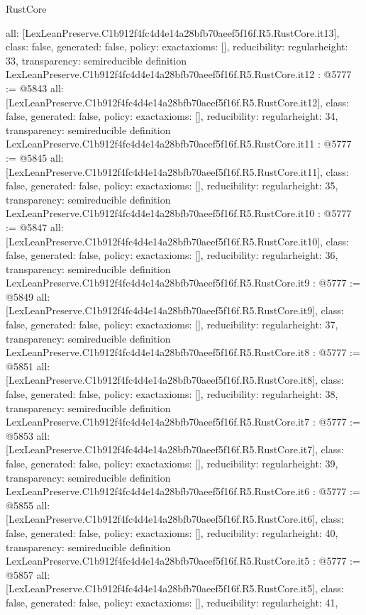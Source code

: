 \begin{lexlean}{RustCore}
\begin{coremodule}
{  all: [LexLeanPreserve.C1b912f4fc4d4e14a28bfb70aeef5f16f.R5.RustCore.it13],
  class: false,
  generated: false,
  policy: exact{axioms: []},
  reducibility: regular{height: 33},
  transparency: semireducible
}
definition LexLeanPreserve.C1b912f4fc4d4e14a28bfb70aeef5f16f.R5.RustCore.it12 : @5777 := @5843 {
  all: [LexLeanPreserve.C1b912f4fc4d4e14a28bfb70aeef5f16f.R5.RustCore.it12],
  class: false,
  generated: false,
  policy: exact{axioms: []},
  reducibility: regular{height: 34},
  transparency: semireducible
}
definition LexLeanPreserve.C1b912f4fc4d4e14a28bfb70aeef5f16f.R5.RustCore.it11 : @5777 := @5845 {
  all: [LexLeanPreserve.C1b912f4fc4d4e14a28bfb70aeef5f16f.R5.RustCore.it11],
  class: false,
  generated: false,
  policy: exact{axioms: []},
  reducibility: regular{height: 35},
  transparency: semireducible
}
definition LexLeanPreserve.C1b912f4fc4d4e14a28bfb70aeef5f16f.R5.RustCore.it10 : @5777 := @5847 {
  all: [LexLeanPreserve.C1b912f4fc4d4e14a28bfb70aeef5f16f.R5.RustCore.it10],
  class: false,
  generated: false,
  policy: exact{axioms: []},
  reducibility: regular{height: 36},
  transparency: semireducible
}
definition LexLeanPreserve.C1b912f4fc4d4e14a28bfb70aeef5f16f.R5.RustCore.it9 : @5777 := @5849 {
  all: [LexLeanPreserve.C1b912f4fc4d4e14a28bfb70aeef5f16f.R5.RustCore.it9],
  class: false,
  generated: false,
  policy: exact{axioms: []},
  reducibility: regular{height: 37},
  transparency: semireducible
}
definition LexLeanPreserve.C1b912f4fc4d4e14a28bfb70aeef5f16f.R5.RustCore.it8 : @5777 := @5851 {
  all: [LexLeanPreserve.C1b912f4fc4d4e14a28bfb70aeef5f16f.R5.RustCore.it8],
  class: false,
  generated: false,
  policy: exact{axioms: []},
  reducibility: regular{height: 38},
  transparency: semireducible
}
definition LexLeanPreserve.C1b912f4fc4d4e14a28bfb70aeef5f16f.R5.RustCore.it7 : @5777 := @5853 {
  all: [LexLeanPreserve.C1b912f4fc4d4e14a28bfb70aeef5f16f.R5.RustCore.it7],
  class: false,
  generated: false,
  policy: exact{axioms: []},
  reducibility: regular{height: 39},
  transparency: semireducible
}
definition LexLeanPreserve.C1b912f4fc4d4e14a28bfb70aeef5f16f.R5.RustCore.it6 : @5777 := @5855 {
  all: [LexLeanPreserve.C1b912f4fc4d4e14a28bfb70aeef5f16f.R5.RustCore.it6],
  class: false,
  generated: false,
  policy: exact{axioms: []},
  reducibility: regular{height: 40},
  transparency: semireducible
}
definition LexLeanPreserve.C1b912f4fc4d4e14a28bfb70aeef5f16f.R5.RustCore.it5 : @5777 := @5857 {
  all: [LexLeanPreserve.C1b912f4fc4d4e14a28bfb70aeef5f16f.R5.RustCore.it5],
  class: false,
  generated: false,
  policy: exact{axioms: []},
  reducibility: regular{height: 41},
}
\end{coremodule}
\end{lexlean}
